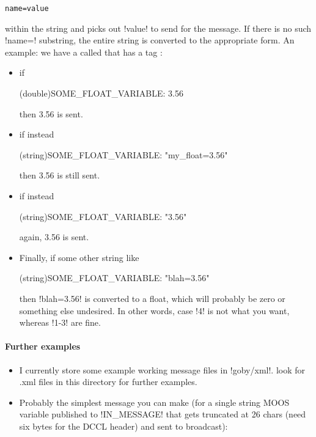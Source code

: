 \begin{itemize}
\begin{verbatim}
name=value
\end{verbatim}
within the string and picks out !value! to send for the message. If there is no such !name=! substring, the entire string is converted to the appropriate form. An example: we have a  called  that has a tag : 
\begin{itemize}
\item if
\begin{boxedverbatim}
(double)SOME_FLOAT_VARIABLE: 3.56
\end{boxedverbatim}
then 3.56 is sent.
\item if instead 
\begin{boxedverbatim}
(string)SOME_FLOAT_VARIABLE: "my_float=3.56"
\end{boxedverbatim}
then 3.56 is still sent.
\item if instead
\begin{boxedverbatim}
(string)SOME_FLOAT_VARIABLE: "3.56"
\end{boxedverbatim}
again, 3.56 is sent.
\item Finally, if some other string like
\begin{boxedverbatim}
(string)SOME_FLOAT_VARIABLE: "blah=3.56"
\end{boxedverbatim}
\resetbvlinenumber
then !blah=3.56! is converted to a float, which will probably be zero or something else undesired. In other words, case !4! is not what you want, whereas !1-3! are fine.
\end{itemize}
\end{itemize}
\paragraph{Further examples} \label{sec:ex}
\begin{itemize}
\item I currently store some example working message files in !goby/xml!. look for .xml files in this directory for further examples.
\item Probably the simplest message you can make (for a single string MOOS variable published to !IN_MESSAGE! that gets truncated at 26 chars (need six bytes for the DCCL header) and sent to broadcast):
\resetbvlinenumber
\end{itemize}


